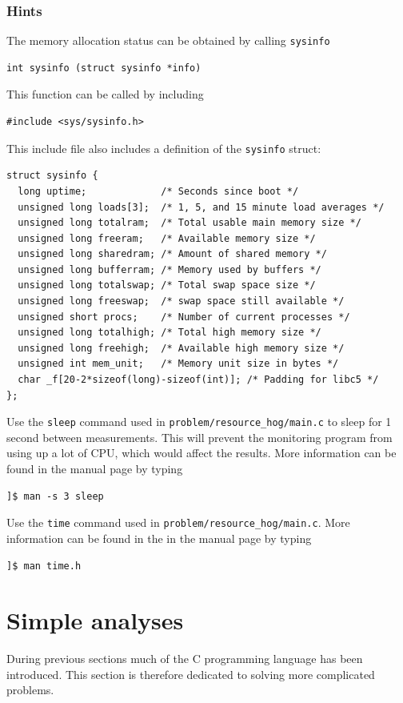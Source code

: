 \documentclass[11pt]{scrartcl}
\begin{document}
\subsubsection*{Hints}
The memory allocation status can be obtained by calling \texttt{sysinfo}
\begin{lstlisting}
int sysinfo (struct sysinfo *info)
\end{lstlisting}
This function can be called by including
\begin{lstlisting}
#include <sys/sysinfo.h>
\end{lstlisting}
This include file also includes a definition of the \texttt{sysinfo} struct:
\begin{lstlisting}
struct sysinfo {
  long uptime;             /* Seconds since boot */
  unsigned long loads[3];  /* 1, 5, and 15 minute load averages */
  unsigned long totalram;  /* Total usable main memory size */
  unsigned long freeram;   /* Available memory size */
  unsigned long sharedram; /* Amount of shared memory */
  unsigned long bufferram; /* Memory used by buffers */
  unsigned long totalswap; /* Total swap space size */
  unsigned long freeswap;  /* swap space still available */
  unsigned short procs;    /* Number of current processes */
  unsigned long totalhigh; /* Total high memory size */
  unsigned long freehigh;  /* Available high memory size */
  unsigned int mem_unit;   /* Memory unit size in bytes */
  char _f[20-2*sizeof(long)-sizeof(int)]; /* Padding for libc5 */
};
\end{lstlisting}
%
Use the \texttt{sleep} command used in
\texttt{problem/resource\_hog/main.c} to sleep for 1 second between
measurements.  This will prevent the monitoring program from using
up a lot of CPU, which would affect the results.  More information can
be found in the manual page by typing
\begin{verbatim}
]$ man -s 3 sleep
\end{verbatim} %
%
Use the \texttt{time} command used in
\texttt{problem/resource\_hog/main.c}.  More information can be found
in the in the manual page by typing
\begin{verbatim}
]$ man time.h
\end{verbatim} %

\clearpage
\newpage

\section{Simple analyses}
During previous sections much of the C programming language has been
introduced.  This section is therefore dedicated to solving more
complicated problems.
\end{document}
